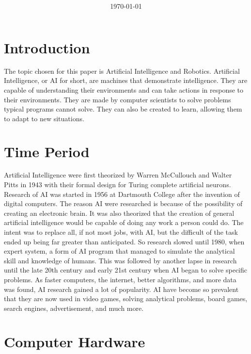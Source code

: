 \documentclass[11pt, twocolumn]{article}
\title{{\large } \thetitle}
\author{\theauthor}
\date{\today}
\begin{document}
\maketitle

\thispagestyle{firstpage}

\section{Introduction}
The topic chosen for this paper is Artificial Intelligence and Robotics. Artificial
Intelligence, or AI for short, are machines that demonstrate intelligence. They are
capable of understanding their environments and can take actions in response to
their environments. They are made by computer scientists to solve problems typical
programs cannot solve. They can also be created to learn, allowing them to adapt to
new situations.

\section{Time Period}
Artificial Intelligence were first theorized by Warren McCullouch and Walter Pitts
in 1943 with their formal design for Turing complete artificial neurons. Research
of AI was started in 1956 at Dartmouth College after the invention of digital
computers. The reason AI were researched is because of the possibility of creating
an electronic brain. It was also theorized that the creation of general artificial
intelligence would be capable of doing any work a person could do. The intent was to
replace all, if not most jobs, with AI, but the difficult of the task ended up being
far greater than anticipated. So research slowed until 1980, when expert system, a
form of AI program that managed to simulate the analytical skill and knowledge of
humans. This was followed by another lapse in research until the late 20th century
and early 21st century when AI began to solve specific problems. As faster computers,
the internet, better algorithms, and more data was found, AI research gained a lot
of popularity. AI have become so prevalent that they are now used in video games,
solving analytical problems, board games, search engines, advertisement, and much
more.

\section{Computer Hardware}
\end{document}
